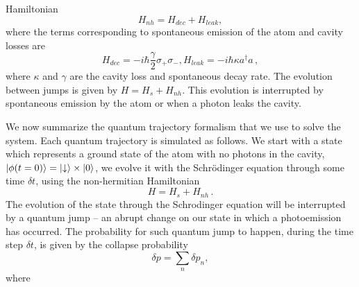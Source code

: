 \documentclass[epj,final]{svjour}
\begin{document}
Hamiltonian
\begin{equation} \label{nh}
H_{nh} = H_{dec} + H_{leak},
\end{equation}
where the terms corresponding to spontaneous emission of the atom and cavity losses are
\begin{subequations}
\begin{equation}
H_{dec} = - i\hbar\frac{\gamma}{2}\sigma_+\sigma_-,
\end{equation}
\begin{equation}
H_{leak} = - i\hbar\kappa a^\dagger a\, ,
\end{equation}
\end{subequations}
where $\kappa$ and $\gamma$ are the cavity loss and spontaneous decay
rate. The evolution between jumps is given by $H=H_s+H_{nh}$. This
evolution is interrupted by spontaneous emission by the atom or when a
photon leaks the cavity. 

We now summarize the quantum trajectory formalism \cite{bla} that we
use to solve the system. Each quantum trajectory is simulated as
follows. We start with a state which represents a ground state of the
atom with no photons in the cavity,
$\ket{\phi(t = 0)} = \ket{\downarrow} \times \ket{0}$, we evolve it
with the Schr\"odinger equation through some time $\delta t$, using the
non-hermitian Hamiltonian
\begin{equation}
H = H_s +H_{nh}\, .
\end{equation}
The evolution of the state through the Schrodinger equation will be
interrupted by a quantum jump – an abrupt change on our state in which
a photoemission has occurred. The probability for such quantum jump to
happen, during the time step $\delta t$, is given by the collapse
probability
\begin{equation} \label{probcol}
\delta p = \sum_n \delta p_n,
\end{equation}
where
\end{document}
